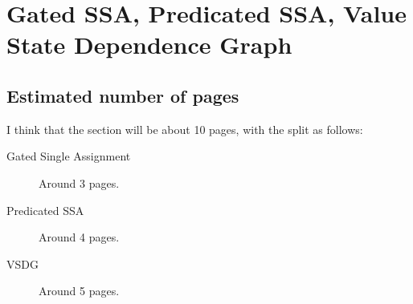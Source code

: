 \chapter*{Gated SSA, Predicated SSA, Value State Dependence Graph}



\section*{Estimated number of pages}

I think that the section will be about 10 pages, with the split as follows:

\begin{description}
\item[Gated Single Assignment] Around 3 pages.
\item[Predicated SSA] Around 4 pages.
\item[VSDG] Around 5 pages.
\end{description}




